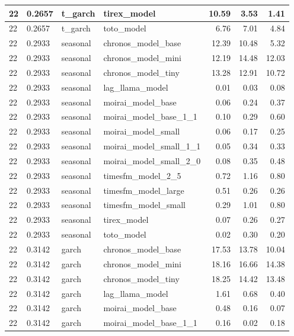 {\begin{tabular}{llllrrr}
\midrule
22 & 0.2657 & t\_garch & tirex\_model & 10.59 & 3.53 & 1.41 \\
\midrule
22 & 0.2657 & t\_garch & toto\_model & 6.76 & 7.01 & 4.84 \\
\midrule
22 & 0.2933 & seasonal & chronos\_model\_base & 12.39 & 10.48 & 5.32 \\
\midrule
22 & 0.2933 & seasonal & chronos\_model\_mini & 12.19 & 14.48 & 12.03 \\
\midrule
22 & 0.2933 & seasonal & chronos\_model\_tiny & 13.28 & 12.91 & 10.72 \\
\midrule
22 & 0.2933 & seasonal & lag\_llama\_model & 0.01 & 0.03 & 0.08 \\
\midrule
22 & 0.2933 & seasonal & moirai\_model\_base & 0.06 & 0.24 & 0.37 \\
\midrule
22 & 0.2933 & seasonal & moirai\_model\_base\_1\_1 & 0.10 & 0.29 & 0.60 \\
\midrule
22 & 0.2933 & seasonal & moirai\_model\_small & 0.06 & 0.17 & 0.25 \\
\midrule
22 & 0.2933 & seasonal & moirai\_model\_small\_1\_1 & 0.05 & 0.34 & 0.33 \\
\midrule
22 & 0.2933 & seasonal & moirai\_model\_small\_2\_0 & 0.08 & 0.35 & 0.48 \\
\midrule
22 & 0.2933 & seasonal & timesfm\_model\_2\_5 & 0.72 & 1.16 & 0.80 \\
\midrule
22 & 0.2933 & seasonal & timesfm\_model\_large & 0.51 & 0.26 & 0.26 \\
\midrule
22 & 0.2933 & seasonal & timesfm\_model\_small & 0.29 & 1.01 & 0.80 \\
\midrule
22 & 0.2933 & seasonal & tirex\_model & 0.07 & 0.26 & 0.27 \\
\midrule
22 & 0.2933 & seasonal & toto\_model & 0.02 & 0.30 & 0.20 \\
\midrule
22 & 0.3142 & garch & chronos\_model\_base & 17.53 & 13.78 & 10.04 \\
\midrule
22 & 0.3142 & garch & chronos\_model\_mini & 18.16 & 16.66 & 14.38 \\
\midrule
22 & 0.3142 & garch & chronos\_model\_tiny & 18.25 & 14.42 & 13.48 \\
\midrule
22 & 0.3142 & garch & lag\_llama\_model & 1.61 & 0.68 & 0.40 \\
\midrule
22 & 0.3142 & garch & moirai\_model\_base & 0.48 & 0.16 & 0.07 \\
\midrule
22 & 0.3142 & garch & moirai\_model\_base\_1\_1 & 0.16 & 0.02 & 0.18 \\

\end{tabular}}
